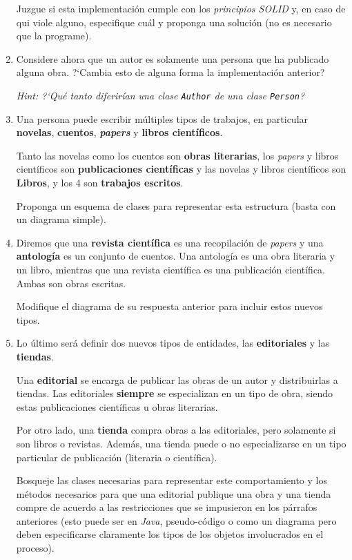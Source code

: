 \begin{Exercise}[title={Publicaciones}]
\begin{enumerate}
        Juzgue si esta implementación cumple con los \textit{principios SOLID} y, en caso
        de qui viole alguno, especifique cuál y proponga una solución (no es necesario 
        que la programe).

      \item Considere ahora que un autor es solamente una persona que ha publicado alguna 
        obra.
        ?`Cambia esto de alguna forma la implementación anterior?

        \textit{Hint: ?`Qué tanto diferirían una clase \texttt{Author} de una clase 
        \texttt{Person}?}
      
      \item Una persona puede escribir múltiples tipos de trabajos, en particular 
        \textbf{novelas}, \textbf{cuentos}, \textbf{\textit{papers}} y \textbf{libros 
        científicos}.

        Tanto las novelas como los cuentos son \textbf{obras literarias}, los 
        \textit{papers} y libros científicos son \textbf{publicaciones científicas} y las 
        novelas y libros científicos son \textbf{Libros}, y los 4 son \textbf{trabajos 
        escritos}.

        Proponga un esquema de clases para representar esta estructura (basta con un 
        diagrama simple).

      
      \item Diremos que una \textbf{revista científica} es una recopilación de 
        \textit{papers} y una \textbf{antología} es un conjunto de cuentos.
        Una antología es una obra literaria y un libro, mientras que una revista 
        científica es una publicación científica.
        Ambas son obras escritas.

        Modifique el diagrama de su respuesta anterior para incluir estos nuevos tipos.
      
      \item Lo último será definir dos nuevos tipos de entidades, las \textbf{editoriales}
        y las \textbf{tiendas}.

        Una \textbf{editorial} se encarga de publicar las obras de un autor y 
        distribuirlas a tiendas.
        Las editoriales \textbf{siempre} se especializan en un tipo de obra, siendo estas
        publicaciones científicas u obras literarias.

        Por otro lado, una \textbf{tienda} compra obras a las editoriales, pero solamente 
        si son libros o revistas.
        Además, una tienda puede o no especializarse en un tipo particular de publicación
        (literaria o científica).

        Bosqueje las clases necesarias para representar este comportamiento y los métodos 
        necesarios para que una editorial publique una obra y una tienda compre de acuerdo 
        a las restricciones que se impusieron en los párrafos anteriores (esto puede ser 
        en \textit{Java}, pseudo-código o como un diagrama pero deben especificarse 
        claramente los tipos de los objetos involucrados en el proceso).
    \end{enumerate}
  \end{Exercise}

